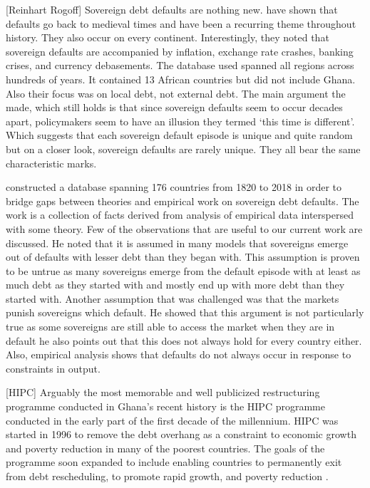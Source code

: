 \documentclass[12pt, a4paper]{article}
\begin{document}
	[Reinhart Rogoff] Sovereign debt defaults are nothing new.  have shown that defaults go back to medieval times and have been a recurring theme throughout history. They also occur on every continent. Interestingly, they noted that sovereign defaults are accompanied by inflation, exchange rate crashes, banking crises, and currency debasements. The database used spanned all regions across hundreds of years. It contained 13 African countries but did not include Ghana. Also their focus was on local debt, not external debt. The main argument the made, which still holds is that since sovereign defaults seem to occur decades apart, policymakers seem to have an illusion they termed `this time is different'. Which suggests that each sovereign default episode is unique and quite random but on a closer look, sovereign defaults are rarely unique. They all bear the same characteristic marks.
	
	
	 constructed a database spanning 176 countries from 1820 to 2018 in order to bridge gaps between theories and empirical work on sovereign debt defaults. The work is a collection of facts derived from analysis of empirical data interspersed with some theory. Few of the observations that are useful to our current work are discussed. He noted that it is assumed in many models that sovereigns emerge out of defaults with lesser debt than they began with. This assumption is proven to be untrue as many sovereigns emerge from the default episode with at least as much debt as they started with and mostly end up with more debt than they started with. Another assumption that was challenged was that the markets punish sovereigns which default. He showed that this argument is not particularly true as some sovereigns are still able to access the market when they are in default he also points out that this does not always hold for every country either. Also, empirical analysis shows that defaults do not always occur in response to constraints in output.
	
	
	
	[HIPC]
	Arguably the most memorable and well publicized restructuring programme conducted in Ghana's recent history is the HIPC programme conducted in the early part of the first decade of the millennium.  HIPC was started in 1996 to remove the debt overhang as a constraint to economic growth and poverty reduction in many of the poorest countries. The goals of the programme soon expanded to include enabling countries to permanently exit from debt rescheduling, to promote rapid growth, and poverty reduction \cite{gautam2003debt}.
	
\end{document}
